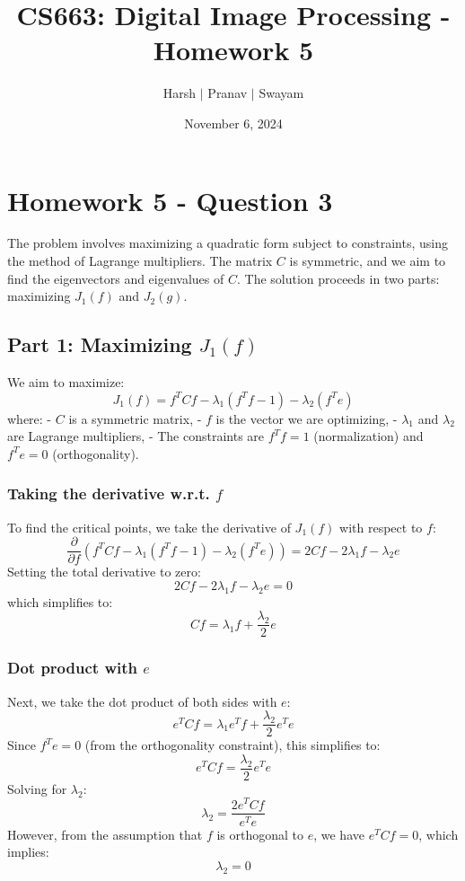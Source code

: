 \documentclass{article}
\title{CS663: Digital Image Processing - Homework 5}
\author{Harsh $\vert$ Pranav $\vert$ Swayam}
\date{November 6, 2024}
\begin{document}
\maketitle
\flushleft
\section*{Homework 5 - Question 3}

The problem involves maximizing a quadratic form subject to constraints, using the method of Lagrange multipliers. The matrix $C$ is symmetric, and we aim to find the eigenvectors and eigenvalues of $C$. The solution proceeds in two parts: maximizing $J_1(f)$ and $J_2(g)$.

\subsection*{Part 1: Maximizing $J_1(f)$}
We aim to maximize:
\[
J_1(f) = f^T C f - \lambda_1 (f^T f - 1) - \lambda_2 (f^T e)
\]
where:
- $C$ is a symmetric matrix,
- $f$ is the vector we are optimizing,
- $\lambda_1$ and $\lambda_2$ are Lagrange multipliers,
- The constraints are $f^T f = 1$ (normalization) and $f^T e = 0$ (orthogonality).

\subsubsection*{Taking the derivative w.r.t. $f$}

To find the critical points, we take the derivative of $J_1(f)$ with respect to $f$:
\[
\frac{\partial}{\partial f} (f^T C f - \lambda_1 (f^T f - 1) - \lambda_2 (f^T e)) = 2 C f - 2 \lambda_1 f - \lambda_2 e 
\]
Setting the total derivative to zero:
\[
2 C f - 2 \lambda_1 f - \lambda_2 e = 0
\]
which simplifies to:
\[
C f = \lambda_1 f + \frac{\lambda_2}{2} e
\]

\subsubsection*{Dot product with $e$}

Next, we take the dot product of both sides with $e$:
\[
e^T C f = \lambda_1 e^T f + \frac{\lambda_2}{2} e^T e
\]
Since $f^T e = 0$ (from the orthogonality constraint), this simplifies to:
\[
e^T C f = \frac{\lambda_2}{2} e^T e
\]
Solving for $\lambda_2$:
\[
\lambda_2 = \frac{2 e^T C f}{e^T e}
\]
However, from the assumption that $f$ is orthogonal to $e$, we have $e^T C f = 0$, which implies:
\[
\lambda_2 = 0
\]
\end{document}
